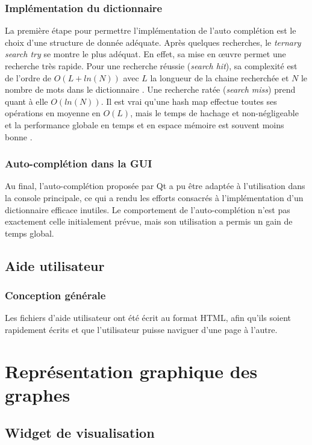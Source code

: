 \documentclass[french]{article}
\begin{document}
			\subsubsection{Implémentation du dictionnaire}
			La première étape pour permettre l'implémentation de l'auto complétion est le choix d'une structure de donnée adéquate. Après quelques recherches, le \textit{ternary search try} se montre le plus adéquat. En effet, sa mise en œuvre permet une recherche très rapide. Pour une recherche réussie (\textit{search hit}), sa complexité est de l'ordre de $O(L + ln(N))$ avec $L$ la longueur de la chaine recherchée et $N$ le nombre de mots dans le dictionnaire \cite{tries}. Une recherche ratée (\textit{search miss}) prend quant à elle $O(ln(N))$. Il est vrai qu'une hash map effectue toutes ses opérations en moyenne en $O(L)$, mais le temps de hachage et non-négligeable et la performance globale en temps et en espace mémoire est souvent moins bonne \cite{sedgewick}.
			
			\subsubsection{Auto-complétion dans la GUI}
			Au final, l'auto-complétion proposée par Qt a pu être adaptée à l'utilisation dans la console principale, ce qui a rendu les efforts consacrés à l'implémentation d'un dictionnaire efficace inutiles. Le comportement de l'auto-complétion n'est pas exactement celle initialement prévue, mais son utilisation a permis un gain de temps global.
			
		\subsection{Aide utilisateur}
			\subsubsection{Conception générale}
			Les fichiers d'aide utilisateur ont été écrit au format HTML, afin qu'ils soient rapidement écrits et que l'utilisateur puisse naviguer d'une page à l'autre.
	
	\section{Représentation graphique des graphes}
		\subsection{Widget de visualisation}
\end{document}
